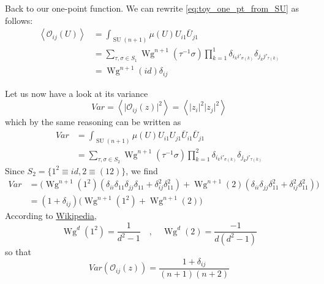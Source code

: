 \documentclass[a4paper,11pt]{article}
\theoremstyle{definition}
\DeclareMathOperator{\SU}{SU}
\DeclareMathOperator{\Wg}{Wg}
\newcommand{\OO}{\mathcal O}
\begin{document}
Back to our one-point function.
We can rewrite \eqref{eq:toy_one_pt_from_SU} as follows:
\begin{equation}
  \begin{split} 
    \left\langle \OO_{ij}(U) \right\rangle &= \int_{\SU(n+1)}\mu(U) U_{i1}\bar U_{j1} \\
    &= \sum_{\tau,\sigma \in S_1} \Wg^{n+1}(\tau^{-1}\sigma) \prod_{k = 1}^1 \delta_{i_k i'_{\sigma(k)}}\delta_{j_k j'_{\tau(k)}} \\
    &= \Wg^{n+1}(id) \delta_{ij}
  \end{split}
\end{equation}

Let us now have a look at its variance
\begin{equation}
  Var = \left\langle \lvert \OO_{ij}(z) \rvert^2  \right\rangle = \left\langle \lvert z_i \rvert^2 \lvert z_j \rvert^2 \right\rangle 
\end{equation}
which by the same reasoning can be written as
\begin{equation}
  \begin{split} 
    Var &=  \int_{\SU(n+1)} \mu(U) U_{i1}U_{j1}\bar U_{i1} \bar U_{j1} \\
    &= \sum_{\tau,\sigma \in S_2} \Wg^{n+1}(\tau^{-1}\sigma) \prod_{k = 1}^2 \delta_{i_k i'_{\sigma(k)}}\delta_{j_k j'_{\tau(k)}} 
  \end{split}
\end{equation}
Since $S_2 = \{ 1^2 \equiv id, 2 \equiv (12) \}$, we find
\begin{equation}
  \begin{split} 
    Var &= \Big( \Wg^{n+1}(1^2) \left( \delta_{ii}\delta_{11}\delta_{jj}\delta_{11} + \delta^2_{ij}\delta^2_{11} \right) +  \Wg^{n+1}(2) \left( \delta_{ii}\delta_{jj}\delta^2_{11} + \delta_{ij}^2\delta^2_{11} \right)\Big) \\
    &= \left( 1 + \delta_{ij} \right) \Big( \Wg^{n+1}(1^2) + \Wg^{n+1}(2) \Big) 
  \end{split}
\end{equation}
According to \href{https://en.wikipedia.org/wiki/Weingarten_function}{Wikipedia}, 
\begin{equation}
  \Wg^{d}(1^2) = \frac{1}{d^2 - 1} \quad , \quad \Wg^d(2) = \frac{-1}{d(d^2-1)}
\end{equation}
so that 
\begin{equation}
  \boxed{
  Var(\OO_{ij}(z)) = \frac{1 + \delta_{ij}}{(n+1)(n+2)}
}
  \end{equation}
\end{document}
